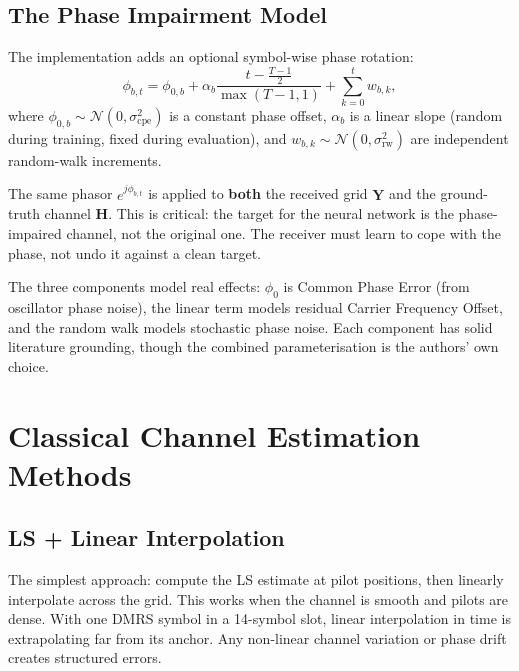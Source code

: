 \documentclass[11pt,a4paper]{article}
\newcommand{\bH}{\mathbf{H}}
\newcommand{\bY}{\mathbf{Y}}
\begin{document}
	\subsection{The Phase Impairment Model}
	
	The implementation adds an optional symbol-wise phase rotation:
	\begin{equation}
		\phi_{b,t} = \phi_{0,b} + \alpha_b \frac{t - \frac{T-1}{2}}{\max(T-1,1)} + \sum_{k=0}^{t} w_{b,k},
		\label{eq:phase_model}
	\end{equation}
	where $\phi_{0,b} \sim \mathcal{N}(0, \sigma_{\mathrm{cpe}}^2)$ is a constant phase offset, $\alpha_b$ is a linear slope (random during training, fixed during evaluation), and $w_{b,k} \sim \mathcal{N}(0, \sigma_{\mathrm{rw}}^2)$ are independent random-walk increments.
	
	\begin{warning}
		The same phasor $e^{j\phi_{b,t}}$ is applied to \textbf{both} the received grid $\bY$ and the ground-truth channel $\bH$.  This is critical: the target for the neural network is the phase-impaired channel, not the original one.  The receiver must learn to cope with the phase, not undo it against a clean target.
	\end{warning}
	
	The three components model real effects: $\phi_0$ is Common Phase Error (from oscillator phase noise), the linear term models residual Carrier Frequency Offset, and the random walk models stochastic phase noise.  Each component has solid literature grounding, though the combined parameterisation is the authors' own choice.
	
	\section{Classical Channel Estimation Methods}
	
	\subsection{LS + Linear Interpolation}
	
	The simplest approach: compute the LS estimate at pilot positions, then linearly interpolate across the grid.  This works when the channel is smooth and pilots are dense.  With one DMRS symbol in a 14-symbol slot, linear interpolation in time is extrapolating far from its anchor.  Any non-linear channel variation or phase drift creates structured errors.
	
\end{document}
